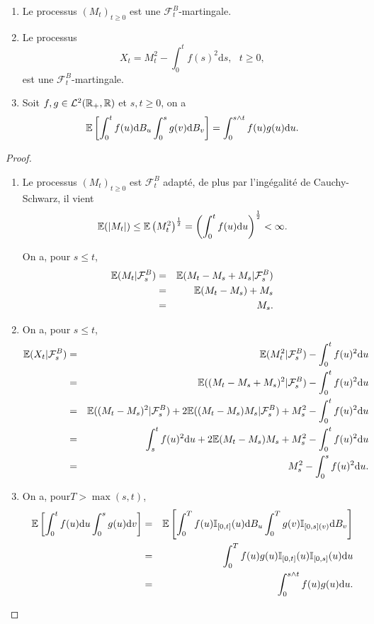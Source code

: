 \begin{prop}
\begin{enumerate}
\item Le processus $(M_t)_{t\geq 0}$ est une $\mathcal{F}_t^B$-martingale.
\item Le processus
$$
X_t = M_t^2 - \int_0^tf(s)^2\text{d}s,\text{ }t\geq 0,
$$
est une $\mathcal{F}_t^B$-martingale.
\item Soit $f,g\in \mathcal{L}^2(\mathbb{R}_+,\mathbb{R})$ et $s,t\geq 0$, on a 
$$
\mathbb{E}\left[\int_0^tf(u)\text{d}B_u\int_0^sg(v)\text{d}B_v\right] = \int_0^{s\land t}f(u)g(u)\text{d}u. 
$$
\end{enumerate}
\end{prop}
\begin{proof}
\begin{enumerate}
	\item  Le processus $(M_t)_{t\geq0}$ est $\mathcal{F}_t^B$ adapté, de plus par l'ingégalité de Cauchy-Schwarz, il vient 
	$$
	\mathbb{E}(|M_t|)\leq \mathbb{E}\left(M_t^2\right)^\frac 12 = \left(\int_0^t f(u)\text{d}u\right)^\frac 12 <\infty.
	$$

	On a, pour $s\leq t$,
	\begin{eqnarray*}
	\mathbb{E}(M_t|\mathcal{F}_s^B)&=&\mathbb{E}(M_t-M_s +M_s|\mathcal{F}_s^B)\\
	&=&\mathbb{E}(M_t-M_s) +M_s\\
	&=& M_s.
	\end{eqnarray*}
	\item On a, pour $s\leq t$,
	\begin{eqnarray*}
	\mathbb{E}(X_t|\mathcal{F}_s^B)&=&\mathbb{E}(M_t^2|\mathcal{F}_s^B) - \int_0^tf(u)^2\text{d}u\\
	&=&\mathbb{E}((M_t-M_s+M_s)^2|\mathcal{F}_s^B) - \int_0^tf(u)^2\text{d}u\\
	&=&\mathbb{E}((M_t-M_s)^2|\mathcal{F}_s^B)+2\mathbb{E}((M_t-M_s)M_s|\mathcal{F}_s^B) + M_s^2-\int_0^tf(u)^2\text{d}u\\
	&=&\int_s^t f(u)^2\text{d}u + 2\mathbb{E}(M_t-M_s)M_s + M_s^2 - \int_0^tf(u)^2\text{d}u\\
	&=&M_s^2 - \int_0^sf(u)^2\text{d}u.
	\end{eqnarray*}
	\item On a, pour$T>\max(s,t)$,
	\begin{eqnarray*}
	\mathbb{E}\left[\int_0^tf(u)\text{d}u\int_0^sg(u)\text{d}v\right]&=&\mathbb{E}\left[\int_0^T f(u)\mathbb{I}_{[0,t]}(u)\text{d}B_u\int_0^T g(v)\mathbb{I}_{[0,s](v)}\text{d}B_v\right]\\
	&=&\int_0^T f(u)g(u)\mathbb{I}_{[0,t]}(u)\mathbb{I}_{[0,s]}(u)\text{d}u\\
	&=&\int_0^{s\land t} f(u)g(u)\text{d}u.\\
	\end{eqnarray*}
\end{enumerate}
\end{proof}




